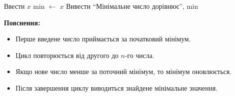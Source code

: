 \documentclass{scrreprt} %
\begin{document}
	
	\begin{tcolorbox}[colback=blue!10!white, colframe=blue!50!black, arc=2mm]
		\begin{algorithm}[H]
			\SetAlgoLined
			Ввести $x$\;
			min $\leftarrow$ $x$\;
			Вивести ``Мінімальне число дорівнює'', min\;
			\caption{Пошук\_мінімального\_елемента}
		\end{algorithm}
	\end{tcolorbox}
	\textbf{Пояснення:}
	\begin{itemize}
		\item Перше введене число приймається за початковий мінімум.
		\item Цикл повторюється від другого до $n$-го числа.
		\item Якщо нове число менше за поточний мінімум, то мінімум оновлюється.
		\item Після завершення циклу виводиться знайдене мінімальне значення.
	\end{itemize}
\end{document}
